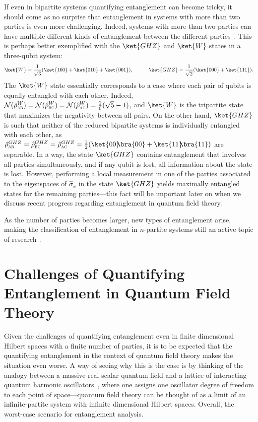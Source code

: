 \documentclass[letterpaper,12pt,titlepage,oneside,final]{book}
\renewcommand{\r}{\hat{\rho}}
\newcommand{\tc}[1]{\textsc{#1}}
\begin{document}
If even in bipartite systems quantifying entanglement can become tricky, it should come as no surprise that entanglement in systems with more than two parties is even more challenging. Indeed, systems with more than two parties can have multiple different kinds of entanglement between the different parties~\cite{twoQubitInequivEnt,twoQubitInequivEntCabello}. This is perhaps better exemplified with the $\ket{GHZ}$ and $\ket{W}$ states in a three-qubit system:
\begin{align}\label{eq:GHZW}
    \ket{W} = \frac{1}{\sqrt{3}}(\ket{100} + \ket{010} + \ket{001}),\quad\quad\quad
    \ket{GHZ} = \frac{1}{\sqrt{2}}(\ket{000} + \ket{111}).
\end{align}
The $\ket{W}$ state essentially corresponds to a case where each pair of qubits is equally entangled with each other. Indeed, {$\mathcal{N}(\hat{\rho}^W_\tc{ab}) = \mathcal{N}(\hat{\rho}^W_\tc{bc}) = \mathcal{N}(\hat{\rho}^W_\tc{ac}) = \frac{1}{6}(\sqrt{5}-1)$, and $\ket{W}$ is the tripartite state that maximizes the negativity between all pairs.} On the other hand, $\ket{GHZ}$ is such that neither of the reduced bipartite systems is individually entangled with each other, as $\r^{GHZ}_{\tc{ab}} = \r^{GHZ}_{\tc{bc}} = \r^{GHZ}_{\tc{ac}} = \frac{1}{2}(\ket{00}\!\!\bra{00}+\ket{11}\!\!\bra{11})$ are separable. In a way, the state $\ket{GHZ}$ contains entanglement that involves all parties simultaneously, and if any qubit is lost, all information about the state is lost. However, performing a local measurement in one of the parties associated to the eigenspaces of $\hat{\sigma}_x$ in the state $\ket{GHZ}$ yields maximally entangled states for the remaining parties---this fact will be important later on when we discuss recent progress regarding entanglement in quantum field theory. 

As the number of parties becomes larger, new types of entanglement arise, making the classification of entanglement in $n$-partite systems still an active topic of research~\cite{entQuantFiniteDim2013,EntQuantNature2016,MarceloTripartite2019}.


\section{Challenges of Quantifying Entanglement in Quantum Field Theory}\label{sec:entQFThard}


Given the challenges of quantifying entanglement even in finite dimensional Hilbert spaces with a finite number of parties, it is to be expected that the quantifying entanglement in the context of quantum field theory makes the situation even worse. A way of seeing why this is the case is by thinking of the analogy between a massive real scalar quantum field and a lattice of interacting quantum harmonic oscillators~\cite{areaLaw1993}, where one assigns one oscillator degree of freedom to each point of space---quantum field theory can be thought of as a limit of an infinite-partite system with infinite dimensional Hilbert spaces. Overall, the worst-case scenario for entanglement analysis.
\end{document}
